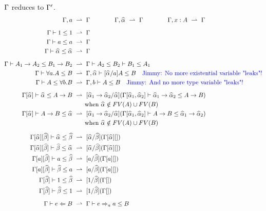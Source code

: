 \begin{figure}[t]
 $\Gamma$ reduces to $\Gamma'$.
\begin{gather*}
\begin{aligned}
\Gm, a &\rto \Gm \qquad\qquad
\Gm, \al \rto \Gm \qquad\qquad
\Gm, x:A \rto \Gm
\\[2mm]
\Gm \vdash 1\le 1 &\rto \Gm\\
\Gm \vdash a\le a &\rto \Gm\\
\Gm \vdash \al\le \al &\rto \Gm
\\[2mm]
\Gm \vdash A_1\to A_2 \le B_1\to B_2 &\rto \Gm \vdash A_2 \le B_2 \vdash B_1\le A_1\\
\Gm \vdash \forall a. A\le B &\rto \Gm,\al \vdash [\al/a]A\le B \quad\text{\jimmy{No more existential variable "leaks"!}}\\
\Gm \vdash A\le \forall b. B &\rto \Gm,b \vdash A\le B \quad\text{\jimmy{And no more type variable "leaks"!}}
\\[2mm]
\Gm[\al] \vdash \al \le A\to B &\rto [\al[1]\to\al[2]/\al] (\Gm[\al[1], \al[2]] \vdash \al[1]\to \al[2] \le A \to B)\\
 &\qquad \text{when }\al\notin FV(A)\cup FV(B)\\
\Gm[\al] \vdash A\to B \le \al &\rto [\al[1]\to \al[2]/\al] (\Gm[\al[1], \al[2]] \vdash A \to B \le \al[1]\to \al[2])\\
 &\qquad \text{when }\al\notin FV(A)\cup FV(B)
 \\[2mm]
\Gm[\al][\bt] \vdash \al \le \bt &\rto [\al/\bt](\Gm[\al][])\\
\Gm[\al][\bt] \vdash \bt \le \al &\rto [\al/\bt](\Gm[\al][])\\
\Gm[a][\bt] \vdash a \le \bt &\rto [a/\bt](\Gm[a][])\\
\Gm[a][\bt] \vdash \bt \le a &\rto [a/\bt](\Gm[a][])\\
\Gm[\bt] \vdash 1 \le \bt &\rto [1/\bt](\Gm[])\\
\Gm[\bt] \vdash \bt \le 1 &\rto [1/\bt](\Gm[])
\\[2mm]
\Gm \vdash e \Lto B &\rto \Gm \vdash e\To_a a\le B\\

\end{aligned}
\end{gather*}
\end{figure}
